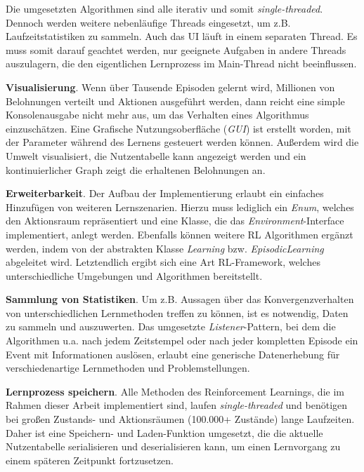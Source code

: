 Die umgesetzten Algorithmen sind alle iterativ und somit \textit{single-threaded}. Dennoch werden weitere nebenläufige Threads eingesetzt, um z.B. Laufzeitstatistiken zu sammeln. Auch das UI läuft in einem separaten Thread. Es muss somit darauf geachtet werden, nur geeignete Aufgaben in andere Threads auszulagern, die den eigentlichen Lernprozess im Main-Thread nicht beeinflussen.
\par 
\textbf{Visualisierung}. Wenn über Tausende Episoden gelernt wird, Millionen von Belohnungen verteilt und Aktionen ausgeführt werden, dann reicht eine simple Konsolenausgabe nicht mehr aus, um das Verhalten eines Algorithmus einzuschätzen. Eine Grafische Nutzungsoberfläche (\textit{GUI}) ist erstellt worden, mit der Parameter während des Lernens gesteuert werden können. Außerdem wird die Umwelt visualisiert, die Nutzentabelle kann angezeigt werden und ein kontinuierlicher Graph zeigt die erhaltenen Belohnungen an.

\textbf{Erweiterbarkeit}. Der Aufbau der Implementierung erlaubt ein einfaches Hinzufügen von weiteren Lernszenarien. Hierzu muss lediglich ein \textit{Enum}, welches den Aktionsraum repräsentiert und eine Klasse, die das \textit{Environment}-Interface implementiert, anlegt werden. Ebenfalls können weitere RL Algorithmen ergänzt werden, indem von der abstrakten Klasse \textit{Learning} bzw. \textit{EpisodicLearning} abgeleitet wird. Letztendlich ergibt sich eine Art RL-Framework, welches unterschiedliche Umgebungen und Algorithmen bereitstellt.

\textbf{Sammlung von Statistiken}. Um z.B. Aussagen über das Konvergenzverhalten von unterschiedlichen Lernmethoden treffen zu können, ist es notwendig, Daten zu sammeln und auszuwerten. Das umgesetzte \textit{Listener}-Pattern, bei dem die Algorithmen u.a. nach jedem Zeitstempel oder nach jeder kompletten Episode ein Event mit Informationen auslösen, erlaubt eine generische Datenerhebung für verschiedenartige Lernmethoden und Problemstellungen.

\textbf{Lernprozess speichern}. Alle Methoden des Reinforcement Learnings, die im Rahmen dieser Arbeit implementiert sind, laufen \textit{single-threaded} und benötigen bei großen Zustands- und Aktionsräumen (100.000+ Zustände) lange Laufzeiten. Daher ist eine Speichern- und Laden-Funktion umgesetzt, die die aktuelle Nutzentabelle serialisieren und deserialisieren kann, um einen Lernvorgang zu einem späteren Zeitpunkt fortzusetzen.

